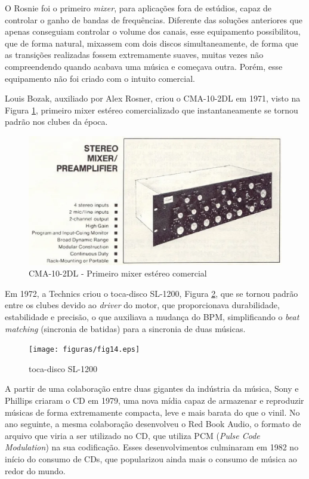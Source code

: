 \par
O Rosnie foi o primeiro \textit{mixer}, para aplicações fora de estúdios, capaz de controlar o ganho de bandas de frequências. Diferente das soluções anteriores que apenas conseguiam controlar o volume dos canais, esse equipamento possibilitou, que de forma natural, mixassem com dois discos simultaneamente, de forma que as transições realizadas fossem extremamente suaves, muitas vezes não compreendendo quando acabava uma música e começava outra. Porém, esse equipamento não foi criado com o intuito comercial.
\par
Louis Bozak, auxiliado por Alex Rosner, criou o CMA-10-2DL em 1971, visto na Figura \ref{fig10}, primeiro mixer estéreo comercializado que instantaneamente se tornou padrão nos clubes da época.

\begin{figure}[h]
	\centering
    \includegraphics[scale=0.6]{figuras/fig10.eps}
	\caption{CMA-10-2DL - Primeiro mixer estéreo comercial}
	\label{fig10}
\end{figure}
\par
Em 1972, a Technics criou o toca-disco SL-1200, Figura \ref{fig14}, que se tornou padrão entre os clubes devido ao \textit{driver} do motor, que proporcionava durabilidade, estabilidade e precisão, o que auxiliava a mudança do BPM, simplificando o \textit{beat matching} (sincronia de batidas) para a sincronia de duas músicas.

\begin{figure}[h]
	\centering
    \texttt{[image: figuras/fig14.eps]}
	\caption{toca-disco SL-1200}
	\label{fig14}
\end{figure}

A partir de uma colaboração entre duas gigantes da indústria da música, Sony e Phillips criaram o CD em 1979, uma nova mídia capaz de armazenar e reproduzir músicas de forma extremamente compacta, leve e mais barata do que o vinil. No ano seguinte, a mesma colaboração desenvolveu o Red Book Audio, o formato de arquivo que viria a ser utilizado no CD, que utiliza PCM (\textit{Pulse Code Modulation}) na sua codificação. Esses desenvolvimentos culminaram em 1982 no início do consumo de CDs, que popularizou ainda mais o consumo de música ao redor do mundo.

